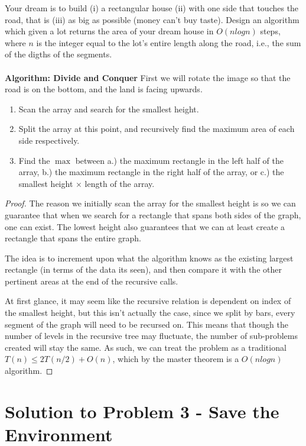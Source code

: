 \documentclass[11pt]{article}
\begin{document}
Your dream is to build (i) a rectangular house (ii) with one side that touches the road, that is (iii) as big as possible (money can't buy taste). Design an algorithm which given a lot returns the area of your dream house in $O(n log n)$ steps, where $n$ is the integer equal to the lot's entire length along the road, i.e., the sum of the digths of the segments.\\
\\
\textbf{Algorithm: Divide and Conquer}
First we will rotate the image so that the road is on the bottom, and the land is facing upwards.
\begin{enumerate}
\item Scan the array and search for the smallest height.
\item Split the array at this point, and recursively find the maximum area of each side respectively.
\item Find the $\max$ between a.) the maximum rectangle in the left half of the array, b.) the maximum rectangle in the right half of the array, or c.) the smallest height $\times$ length of the array.
\end{enumerate}

\begin{proof}
The reason we initially scan the array for the smallest height is so we can guarantee that when we search for a rectangle that spans both sides of the graph, one can exist. The lowest height also guarantees that we can at least create a rectangle that spans the entire graph.

The idea is to increment upon what the algorithm knows as the existing largest rectangle (in terms of the data its seen), and then compare it with the other pertinent areas at the end of the recursive calls.

At first glance, it may seem like the recursive relation is dependent on index of the smallest height, but this isn't actually the case, since we split by bars, every segment of the graph will need to be recursed on. This means that though the number of levels in the recursive tree may fluctuate, the number of sub-problems created will stay the same. As such, we can treat the problem as a traditional $T(n) \leq 2T(n/2) + O(n)$, which by the master theorem is a $O(nlogn)$ algorithm.
\end{proof}

\newpage

\section*{Solution to Problem 3 - Save the Environment}
\end{document}
